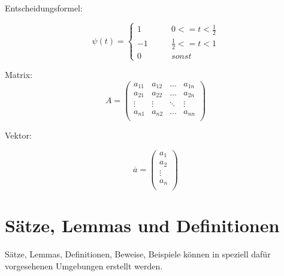 Entscheidungsformel:

\begin{equation}
\psi(t)=\left\{\begin{array}{ccc}
1 &  \qquad 0 <= t < \frac{1}{2} \\
-1 &  \qquad \frac{1}{2} <= t <1 \\
0 & \qquad sonst
\end{array} \right.
\end{equation}


Matrix:
\begin{equation}
A = \left(
\begin{array}{llll}
a_{11} & a_{12} & \ldots & a_{1n} \\
a_{21} & a_{22} & \ldots & a_{2n} \\
\vdots & \vdots & \ddots & \vdots \\
a_{n1} & a_{n2} & \ldots & a_{nn} \\
\end{array}
\right)
\end{equation}

Vektor: 

\begin{equation}
\overline{a} = \left(
\begin{array}{c}
a_{1}\\
a_{2}\\
\vdots\\
a_{n}\\
\end{array}
\right)
\end{equation}

\section{Sätze, Lemmas und Definitionen}

Sätze, Lemmas, Definitionen, Beweise, Beispiele können in speziell dafür vorgesehenen Umgebungen erstellt werden.

